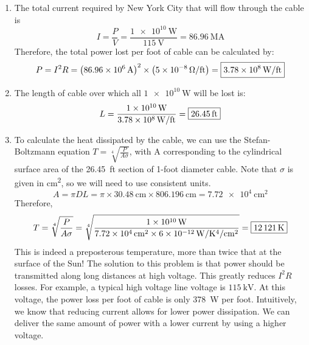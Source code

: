 \begin{enumerate}
    \item
    The total current required by New York City that will flow through the
    cable is 
    \[I = \frac{P}{V} = \frac{\SI{1e10}{\W}}{\SI{115}{\V}} = \SI{86.96}{\mega\A}\]
    Therefore, the total power lost per foot of cable can be calculated by:
    \[P = I^2R = \left(\SI{86.96e6}{\A}\right)^2 \times \left(\SI{5e-8}{\ohm\per ft}\right) = \mans{\SI{3.78e8}{\W\per ft}}\] 
    \item
    The length of cable over which all $\SI{1e10}{\W}$ will be lost is:
    \[L = \frac{\SI{1e10}{\W}}{\SI{3.78e8}{\W\per ft}} = \mans{\SI{26.45}{ft}}\]
    \item
    To calculate the heat dissipated by the cable, we can use the Stefan-Boltzmann equation $T = \sqrt[4]{\frac{P}{A\sigma}}$, with A corresponding to the cylindrical surface area of the \SI{26.45}{ft} section of 1-foot diameter cable. Note that $\sigma$ is given in \si{\cm^2}, so we will need to use consistent units.
    \[A = \pi DL = \pi \times \SI{30.48}{\cm}\times \SI{806.196}{\cm} = \SI{7.72e4}{\cm^2}\]
    Therefore,
    \[T = \sqrt[4]{\frac{P}{A\sigma}} = \sqrt[4]{\frac{\SI{1e10}{\W}}{\SI{7.72e4}{\cm^2} \times \SI{6e-12}{\W\per\kelvin^4\per\cm^2}}} = \mans{\SI{12121}{K}} \]
    This is indeed a preposterous temperature, more than twice that at the surface of the Sun! The solution to this problem is that power should be transmitted along long distances at high voltage. This greatly reduces $I^2R$ losses. For example, a typical high voltage line voltage is $\SI{115}{\kV}$. At this voltage, the power loss per foot of cable is only \SI{378}{\W} per foot. Intuitively, we know that reducing current allows for lower power dissipation. We can deliver the same amount of power with a lower current by using a higher voltage.
\end{enumerate}

